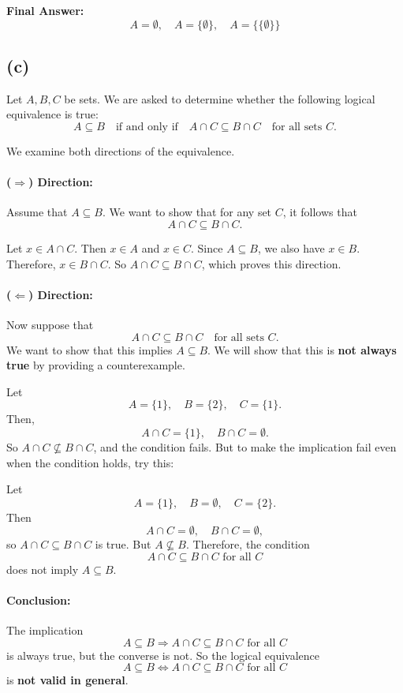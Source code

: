 \documentclass{article}
\begin{document}
\textbf{Final Answer:}
\[
\boxed{
A = \emptyset,\quad
A = \{\emptyset\},\quad
A = \{\{\emptyset\}\}
}
\]

\subsection*{(c)}

Let \( A, B, C \) be sets. We are asked to determine whether the following logical equivalence is true:
\[
A \subseteq B \quad \text{if and only if} \quad A \cap C \subseteq B \cap C \quad \text{for all sets } C.
\]

We examine both directions of the equivalence.

\paragraph{(\( \Rightarrow \)) Direction:} Assume that \( A \subseteq B \). We want to show that for any set \( C \), it follows that
\[
A \cap C \subseteq B \cap C.
\]

Let \( x \in A \cap C \). Then \( x \in A \) and \( x \in C \). Since \( A \subseteq B \), we also have \( x \in B \). Therefore, \( x \in B \cap C \).  
So \( A \cap C \subseteq B \cap C \), which proves this direction.

\paragraph{(\( \Leftarrow \)) Direction:} Now suppose that
\[
A \cap C \subseteq B \cap C \quad \text{for all sets } C.
\]
We want to show that this implies \( A \subseteq B \).  
We will show that this is \textbf{not always true} by providing a counterexample.

Let
\[
A = \{1\}, \quad B = \{2\}, \quad C = \{1\}.
\]
Then,
\[
A \cap C = \{1\}, \quad B \cap C = \emptyset.
\]
So \( A \cap C \nsubseteq B \cap C \), and the condition fails.  
But to make the implication fail even when the condition holds, try this:

Let
\[
A = \{1\}, \quad B = \emptyset, \quad C = \{2\}.
\]
Then
\[
A \cap C = \emptyset, \quad B \cap C = \emptyset,
\]
so \( A \cap C \subseteq B \cap C \) is true. But \( A \not\subseteq B \).  
Therefore, the condition
\[
A \cap C \subseteq B \cap C \text{ for all } C
\]
does not imply \( A \subseteq B \).

\paragraph{Conclusion:}  
The implication
\[
A \subseteq B \Rightarrow A \cap C \subseteq B \cap C \text{ for all } C
\]
is always true, but the converse is not.  
So the logical equivalence
\[
A \subseteq B \iff A \cap C \subseteq B \cap C \text{ for all } C
\]
is \textbf{not valid in general}.
\end{document}
